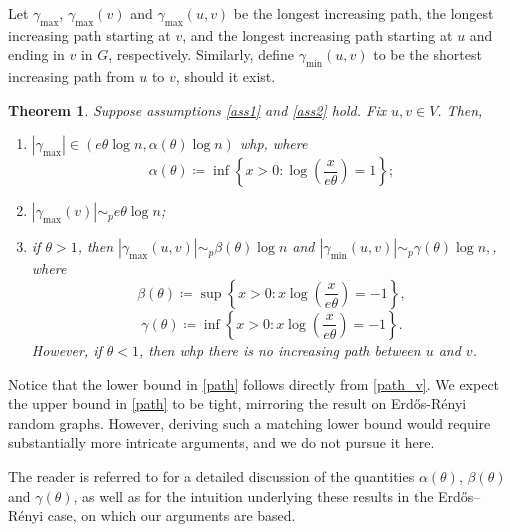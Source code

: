 \documentclass[11pt]{article}
\numberwithin{equation}{section}
\newtheorem{theorem}{Theorem}[section]
\theoremstyle{definition}
\begin{document}
Let $\gamma_{\textrm{max}}$, $\gamma_{\textrm{max}}(v)$ and $\gamma_{\textrm{max}}(u,v)$ be the longest increasing path, the longest increasing path starting at $v$, and the longest increasing path starting at $u$ and ending in $v$ in $G$, respectively. Similarly, define $\gamma_{\min}(u,v)$ to be the shortest increasing path from $u$ to $v$, should it exist. 

\begin{theorem}\label{thm_longest_paths}
Suppose assumptions \ref{ass1} and \ref{ass2} hold. Fix $u,v \in V$. Then, 
\begin{enumerate}[label = (\roman*)]
    \item \label{path}$|\gamma_{\mathrm{max}}| \in (e\theta\log n,\alpha(\theta)\log n)$ whp, where $$\alpha(\theta)\coloneqq \inf\left\{x>0: \log\left(\frac{x}{e\theta}\right)=1 \right\}  ;$$
	\item \label{path_v}$|\gamma_{\mathrm{max}}(v)| \sim_p e\theta\log n$;
	\item \label{path_uv}if $\theta>1$, then $|\gamma_{\mathrm{max}}(u,v)| \sim_p \beta(\theta)\log n$ and $|\gamma_{\mathrm{min}}(u,v)| \sim_p \gamma(\theta)\log n,$, where
    $$\beta(\theta) \coloneqq \sup\left\{x>0:x\log\left(\frac{x}{e\theta}\right)=-1\right\},$$
    $$\gamma(\theta) \coloneqq \inf\left\{x>0:x\log\left(\frac{x}{e\theta}\right)=-1\right\}. $$
    However, if $\theta<1$, then whp there is no increasing path between $u$ and $v$. 
\end{enumerate}
\end{theorem}

Notice that the lower bound in \ref{path} follows directly from \ref{path_v}. We expect the upper bound in \ref{path} to be tight, mirroring the result on Erd\H os-R\'enyi random graphs. However, deriving such a matching lower bound would require substantially more intricate arguments, and we do not pursue it here.

The reader is referred to \cite{BKL24} for a detailed discussion of the quantities $\alpha(\theta)$, $\beta(\theta)$ and $\gamma(\theta)$, as well as for the intuition underlying these results in the Erd\H os–R\'enyi case, on which our arguments are based.
\end{document}
